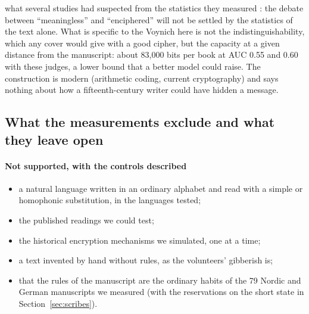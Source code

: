what several studies had suspected from the statistics they measured
\citep{gaskellbowern2022,bowerngaskell2022,parisel2026a,rozanova2026}: the debate between ``meaningless'' and
``enciphered'' will not be settled by the statistics of the text alone. What is specific to the Voynich here is not the
indistinguishability, which any cover would give with a good cipher, but the capacity at a given distance from the
manuscript: about 83{,}000 bits per book at AUC 0.55 and 0.60 with these judges, a lower bound that a better model could
raise. The construction is modern (arithmetic coding, current cryptography) and says nothing about how a
fifteenth-century writer could have hidden a message.

\subsection{What the measurements exclude and what they leave open}

\paragraph{Not supported, with the controls described}
\begin{itemize}
\item a natural language written in an ordinary alphabet and read with a simple or homophonic substitution, in the
  languages tested;
\item the published readings we could test;
\item the historical encryption mechanisms we simulated, one at a time;
\item a text invented by hand without rules, as the volunteers' gibberish is;
\item that the rules of the manuscript are the ordinary habits of the 79 Nordic and German manuscripts we measured
  (with the reservations on the short state in Section~\ref{sec:scribes}).
\end{itemize}

